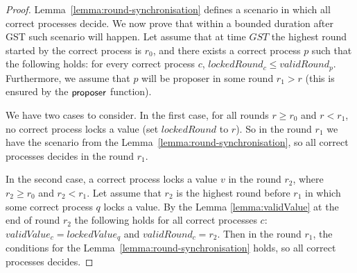 \begin{proof}
Lemma~\ref{lemma:round-synchronisation} defines a scenario in which all correct processes decide. We now prove that within a bounded duration after GST such scenario will happen. Let
assume that at time $GST$ the highest round started by the correct process is $r_0$, and  there exists a correct process $p$ such that the following holds: for every correct process $c$, $lockedRound_c \le validRound_p$. Furthermore, we assume that $p$ will be proposer in some round $r_1 > r$ (this is ensured by the $\mathsf{proposer}$ function). 

We have two cases to consider. In the first case, for all rounds $r \ge r_0$ and $r < r_1$, no correct process locks a value (set $lockedRound$ to $r$). So in the round $r_1$ we have the scenario from the Lemma~\ref{lemma:round-synchronisation}, so all correct processes decides in the round $r_1$.  

In the second case, a correct process locks a value $v$ in the round $r_2$, where $r_2 \ge r_0$ and $r_2 < r_1$.  Let assume that $r_2$ is the highest round before $r_1$ in which some correct process $q$ locks a value. By the Lemma \ref{lemma:validValue} at the end of round $r_2$ the following holds for all correct processes $c$: $validValue_c = lockedValue_q$ and $validRound_c = r_2$. Then in the round $r_1$, the conditions for the Lemma~\ref{lemma:round-synchronisation} holds, so all correct processes decides.
\end{proof}	

